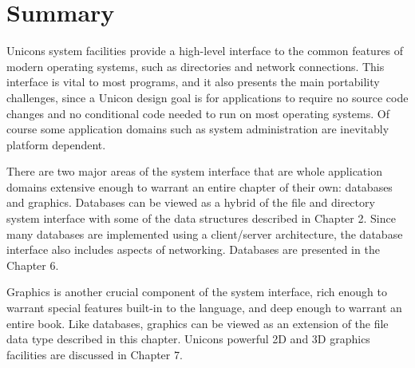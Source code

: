 \section*{Summary}

Unicon{\textquotesingle}s system facilities provide a high-level
interface to the common features of modern operating systems, such
as directories and network connections. This interface is vital to most
programs, and it also presents the main portability challenges,
since a Unicon design goal is for applications to require no
source code changes and no conditional code needed
to run on most operating systems. Of course some application domains
such as system administration are inevitably platform dependent.

There are two major areas of the system interface that are whole
application domains extensive enough to warrant an entire chapter of
their own: databases and graphics. Databases can be
viewed as a hybrid of the file and directory system interface with some
of the data structures described in Chapter 2. Since many databases are
implemented using a client/server architecture, the database interface
also includes aspects of networking. Databases are presented in the
Chapter 6.

Graphics is another crucial component of the system interface, rich
enough to warrant special features built-in to the language, and deep
enough to warrant an entire book. Like databases, graphics can be
viewed as an extension of the file data type described in this chapter.
Unicon{\textquotesingle}s powerful 2D and 3D graphics facilities are
discussed in Chapter 7.

